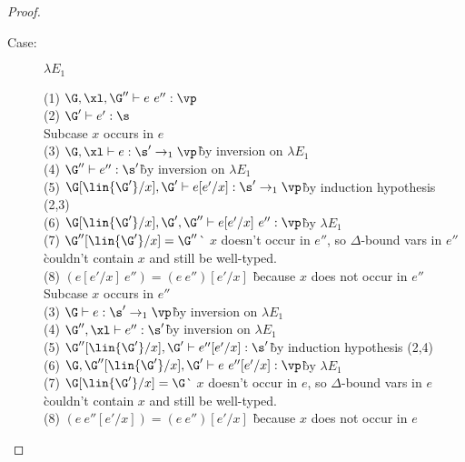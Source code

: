 \begin{proof}
\begin{description}
\item[Case:] $\lambda E_1$
\begin{tabbing}
  (1) $\G, \xl, \G'' \vdash e~e'' : \vp$\\
  (2) $\G' \vdash e' : \s$\\
  Subcase $x$ occurs in $e$\\
  (3) $\G, \xl \vdash e : \s' \to_1 \vp$\` by inversion on $\lambda E_1$\\
  (4) $\G'' \vdash e'' : \s'$\` by inversion on $\lambda E_1$\\
  (5) $\G[\lin{\G'}/x], \G' \vdash e[e'/x] : \s' \to_1 \vp$\` by induction hypothesis (2,3)\\
  (6) $\G[\lin{\G'}/x], \G', \G'' \vdash e[e'/x]~e'' : \vp$\` by $\lambda E_1$\\
  (7) $\G''[\lin{\G'}/x] = \G''$\` $x$ doesn't occur in $e''$, so $\Delta$-bound vars in $e''$ \\
      \` couldn't contain $x$ and still be well-typed.\\
  (8) $(e[e'/x]~e'') = (e~e'')[e'/x]$ \` because $x$ does not occur in $e''$\\
  Subcase $x$ occurs in $e''$\\
  (3) $\G \vdash e : \s' \to_1 \vp$\` by inversion on $\lambda E_1$\\
  (4) $\G'', \xl \vdash e'' : \s'$\` by inversion on $\lambda E_1$\\
  (5) $\G''[\lin{\G'}/x], \G' \vdash e''[e'/x] : \s'$\` by induction hypothesis (2,4)\\
  (6) $\G, \G''[\lin{\G'}/x], \G' \vdash e~e''[e'/x] : \vp$\` by $\lambda E_1$\\
  (7) $\G[\lin{\G'}/x] = \G$\` $x$ doesn't occur in $e$, so $\Delta$-bound vars in $e$ \\
      \` couldn't contain $x$ and still be well-typed.\\
  (8) $(e~e''[e'/x]) = (e~e'')[e'/x]$ \` because $x$ does not occur in $e$\\
\end{tabbing}


\end{description}
\end{proof}
